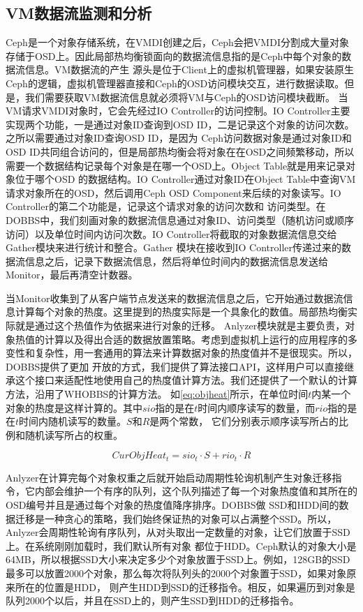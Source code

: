 \subsection{VM数据流监测和分析}
Ceph是一个对象存储系统，在VMDI创建之后，Ceph会把VMDI分割成大量对象存储于OSD上\cite{weil2006ceph}。因此局部热均衡锁面向的数据流信息指的是Ceph中每个对象的数据流信息。VM数据流的产生
源头是位于Client上的虚拟机管理器，如果安装原生Ceph的逻辑，虚拟机管理器直接和Ceph的OSD访问模块交互，进行数据读取。但是，我们需要获取VM数据流信息就必须将VM与Ceph的OSD访问模块截断。
当VM请求VMDI对象时，它会先经过IO Controller的访问控制。IO Controller主要实现两个功能，一是通过对象ID查询到OSD ID，二是记录这个对象的访问次数。之所以需要通过对象ID查询OSD ID，是因为
Ceph访问数据对象是通过对象ID和OSD ID共同组合访问的，但是局部热均衡会将对象在在OSD之间频繁移动，所以需要一个数据结构记录每个对象是在哪一个OSD上。Object Table就是用来记录对象位于哪个OSD
的数据结构。IO Controller通过对象ID在Object Table中查询VM请求对象所在的OSD，然后调用Ceph OSD Component来后续的对象读写。IO Controller的第二个功能是，记录这个请求对象的访问次数和
访问类型。在DOBBS中，我们刻画对象的数据流信息通过对象ID、访问类型（随机访问或顺序访问）以及单位时间内访问次数。IO Controller将截取的对象数据流信息交给Gather模块来进行统计和整合。Gather
模块在接收到IO Controller传递过来的数据流信息之后，记录下数据流信息，然后将单位时间内的数据流信息发送给Monitor，最后再清空计数器。

当Monitor收集到了从客户端节点发送来的数据流信息之后，它开始通过数据流信息计算每个对象的热度。这里提到的热度实际是一个具象化的数值。局部热均衡实际就是通过这个热值作为依据来进行对象的迁移。
Anlyzer模块就是主要负责，对象热值的计算以及得出合适的数据放置策略。考虑到虚拟机上运行的应用程序的多变性和复杂性，用一套通用的算法来计算数据对象的热度值并不是很现实。所以，DOBBS提供了更加
开放的方式，我们提供了算法接口API，这样用户可以直接继承这个接口来适配性地使用自己的热度值计算方法。我们还提供了一个默认的计算方法，沿用了WHOBBS\cite{lingxuan2015whobbs}的计算方法。
如\ref{eq:objheat}所示，在单位时间$t$内某一个对象的热度是这样计算的。其中$sio$指的是在$t$时间内顺序读写的数量，而$rio$指的是在$t$时间内随机读写的数量。$S$和$R$是两个常数，
它们分别表示顺序读写所占的比例和随机读写所占的权重。

\begin{equation}
    \label{eq:objheat}
    CurObjHeat_t = sio_t \cdot S + rio_t \cdot R
  \end{equation}

Anlyzer在计算完每个对象权重之后就开始启动周期性轮询机制产生对象迁移指令，它内部会维护一个有序的队列，这个队列描述了每一个对象热度值和其所在的OSD编号并且是通过每个对象的热度值降序排序。DOBBS做
SSD和HDD间的数据迁移是一种贪心的策略，我们始终保证热的对象可以占满整个SSD。所以，Anlyzer会周期性轮询有序队列，从对头取出一定数量的对象，让它们放置于SSD上。在系统刚刚加载时，我们默认所有对象
都位于HDD。Ceph默认的对象大小是64MB，所以根据SSD大小来决定多少个对象放置于SSD上。例如，128GB的SSD最多可以放置2000个对象，那么每次将队列头的2000个对象置于SSD，如果对象原来所在的位置是HDD，
则产生HDD到SSD的迁移指令。相反，如果遍历到对象是队列2000个以后，并且在SSD上的，则产生SSD到HDD的迁移指令。

